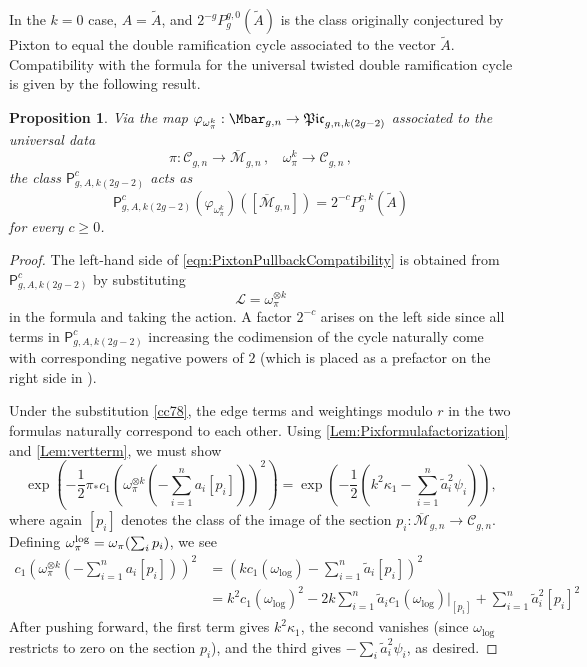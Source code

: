 \documentclass[a4paper,12pt]{article} %
\def\log{\mathrm{log}}
\def\P{\mathsf{P}}
\def\cM{{\mathcal{M}}}
\theoremstyle{definition}
\theoremstyle{plain}%
\newtheorem{proposition}[definition]{Proposition}
\renewcommand{\phi}{\varphi}
\newcommand{\Picabs}{\mathfrak{Pic}}
\begin{document}
In the $k=0$ case, $A=\tilde{A}$, and
$2^{-g} P_g^{g,0}(\tilde{A})$ is the
class originally conjectured by Pixton to
equal the double ramification cycle associated to the vector $\tilde A$. Compatibility with the formula for the universal twisted double ramification cycle is given by the
following result.

\begin{proposition} \label{Prop:PixtonPullbackCompatibility}
Via the map $\phi_{\omega_\pi^k}: \Mbar_{g,n} \to \Picabs_{g,n,k(2g-2)}$ associated to the universal data
\[\pi: \mathcal{C}_{g,n} \rightarrow \overline{\cM}_{g,n}\, , \ \ \ \ \omega_\pi^k \rightarrow \mathcal{C}_{g,n}\, ,\]
the class $\P_{g,A,k(2g-2)}^c$ acts as
\begin{equation} \label{eqn:PixtonPullbackCompatibility}
\P_{g,A,k(2g-2)}^c(\phi_{\omega_\pi^k})([\overline{\mathcal{M}}_{g,n}])=2^{-c} P_g^{c,k}(\tilde A)
\end{equation}
for every $c \geq 0$.
\end{proposition}
\begin{proof}
The left-hand side of \eqref{eqn:PixtonPullbackCompatibility} is obtained from $\P_{g,A,k(2g-2)}^c$ by substituting 
\begin{equation}\label{cc78}
    \mathcal{L} = \omega_\pi^{\otimes k}
    \end{equation}
in
the formula and taking the action. 
A factor $2^{-c}$ arises on the left side
since all terms in $\P_{g,A,k(2g-2)}^c$ increasing the codimension of the cycle naturally come with corresponding negative powers of $2$ (which is placed as
a prefactor on the right side in \cite[Section 1.1]{Janda2016Double-ramifica}).

Under the substitution \eqref{cc78}, 
the edge terms and weightings modulo $r$ in the two formulas 
naturally correspond to each other. 
Using \cref{Lem:Pixformulafactorization} and \cref{Lem:vertterm}, we must
show 
\[\exp \left(-\frac{1}{2} \pi_* c_1(\omega_\pi^{\otimes k}(- \sum_{i=1}^n a_i [p_i]) )^2 \right) = \exp \left(-\frac{1}{2} \left( k^2 \kappa_1 -  \sum_{i=1}^n \tilde a_i^2 \psi_i \right)\right),\]
where again $[p_i]$ denotes the class of the image of the section $p_i: \overline{\mathcal{M}}_{g,n} \to \mathcal{C}_{g,n}$. Defining $\omega_\pi^\textup{log} = \omega_\pi(\sum_i p_i)$, we see
\begin{align*}
c_1(\omega_\pi^{\otimes k}(- \sum_{i=1}^n a_i [p_i]) )^2
& = ( k c_1(\omega_{\log}) - \sum_{i=1}^n \tilde a_i [p_i] ) ^2 \\
& = k^2 c_1(\omega_{\log})^2 - 2 k \sum_{i=1}^n \tilde a_i c_1(\omega_{\log})|_{[p_i]} + \sum_{i=1}^n \tilde a_i^2 [p_i]^2
\end{align*}
After pushing forward, the first term gives $k^2 \kappa_1$, the second vanishes (since $\omega_{\log}$ restricts to zero on the section $p_i$), and the third gives $- \sum_i \tilde a_i^2 \psi_i$, as desired.
\end{proof}
\end{document}
